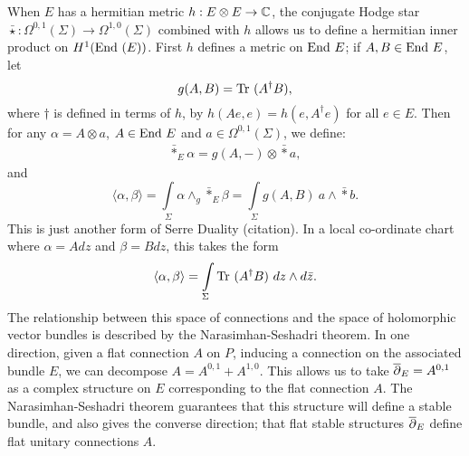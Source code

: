 	When $E$ has a hermitian metric $h:E\otimes E \to \mathbb{C}$, the conjugate Hodge star $\bar{\star}:\Omega^{0,1}(\Sigma) \to \Omega^{1,0}(\Sigma)$ combined with $h$ allows us to define a hermitian inner product on $H^1(\text{End } (E))$.  First $h$ defines a metric on $\text{End } E$; if $A,B\in \text{End } E$, let
	\begin{equation}
		g(A,B) = \text{Tr }(A^\dagger B),
	\end{equation}
	where $\dagger$ is defined in terms of $h$, by $h(Ae,e) = h(e,A^\dagger e)$ for all $e\in E$. Then for any $\alpha = A \otimes a$, $A\in \text{End } E$ and $a \in \Omega^{0,1}(\Sigma)$, we define:
	\begin{align}
		\bar{\ast}_E \alpha = g(A,-)\otimes \bar{\ast}a, 
	\end{align}
	and
	\begin{equation}
		\langle \alpha, \beta \rangle = \int\limits_\Sigma \alpha \wedge_g \bar{\ast}_E \beta =\int\limits_\Sigma g(A,B)~a\wedge \bar{\ast} b.
	\end{equation}
	This is just another form of Serre Duality (citation). In a local co-ordinate chart where $\alpha = Adz$ and $\beta = Bdz$, this takes the form
	\begin{equation}
		\langle \alpha, \beta \rangle = \int\limits_\Sigma \text{Tr }(A^\dagger B)~dz\wedge d\bar{z}.
	\end{equation}
The relationship between this space of connections and the space of holomorphic vector bundles is described by the Narasimhan-Seshadri theorem. In one direction, given a flat connection $A$ on $P$, inducing a connection on the associated bundle $E$, we can decompose $A = A^{0,1} + A^{1,0}$. This allows us to take $\overline{\partial}_E = A^{0,1}$ as a complex structure on $E$ corresponding to the flat connection $A$. The Narasimhan-Seshadri theorem guarantees that this structure will define a stable bundle, and also gives the converse direction; that flat stable structures $\overline{\partial}_E$ define flat unitary connections $A$. 
